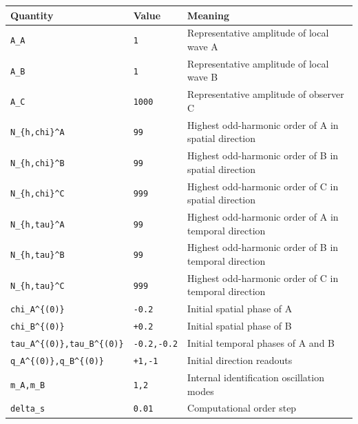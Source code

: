 \documentclass[
  a4paper,
]{article}
\newcounter{none} %
\begin{document}
{\def\LTcaptype{none} %
\begin{longtable}[]{@{}
  >{\raggedright\arraybackslash}p{}
  >{\raggedleft\arraybackslash}p{}
  >{\raggedright\arraybackslash}p{}@{}}
\toprule\noalign{}
\begin{minipage}[b]{\linewidth}\raggedright
Quantity
\end{minipage} & \begin{minipage}[b]{\linewidth}\raggedleft
Value
\end{minipage} & \begin{minipage}[b]{\linewidth}\raggedright
Meaning
\end{minipage} \\
\midrule\noalign{}
\endhead
\bottomrule\noalign{}
\endlastfoot
\texttt{A\_A} & \texttt{1} & Representative amplitude of local wave A \\
\texttt{A\_B} & \texttt{1} & Representative amplitude of local wave B \\
\texttt{A\_C} & \texttt{1000} & Representative amplitude of observer
C \\
\texttt{N\_\{h,chi\}\^{}A} & \texttt{99} & Highest odd-harmonic order of
A in spatial direction \\
\texttt{N\_\{h,chi\}\^{}B} & \texttt{99} & Highest odd-harmonic order of
B in spatial direction \\
\texttt{N\_\{h,chi\}\^{}C} & \texttt{999} & Highest odd-harmonic order
of C in spatial direction \\
\texttt{N\_\{h,tau\}\^{}A} & \texttt{99} & Highest odd-harmonic order of
A in temporal direction \\
\texttt{N\_\{h,tau\}\^{}B} & \texttt{99} & Highest odd-harmonic order of
B in temporal direction \\
\texttt{N\_\{h,tau\}\^{}C} & \texttt{999} & Highest odd-harmonic order
of C in temporal direction \\
\texttt{chi\_A\^{}\{(0)\}} & \texttt{-0.2} & Initial spatial phase of
A \\
\texttt{chi\_B\^{}\{(0)\}} & \texttt{+0.2} & Initial spatial phase of
B \\
\texttt{tau\_A\^{}\{(0)\},tau\_B\^{}\{(0)\}} & \texttt{-0.2,-0.2} &
Initial temporal phases of A and B \\
\texttt{q\_A\^{}\{(0)\},q\_B\^{}\{(0)\}} & \texttt{+1,-1} & Initial
direction readouts \\
\texttt{m\_A,m\_B} & \texttt{1,2} & Internal identification oscillation
modes \\
\texttt{delta\_s} & \texttt{0.01} & Computational order step \\
\end{longtable}
}
\end{document}
